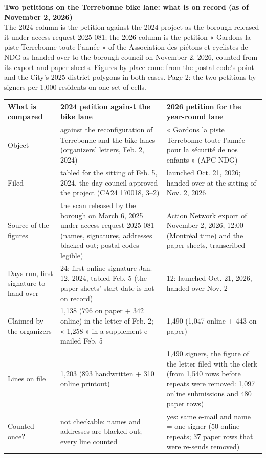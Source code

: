\documentclass[10pt,letterpaper]{article}
\begin{document}
{\large\textbf{Two petitions on the Terrebonne bike lane: what is on record (as of November 2, 2026)}}\\[2pt]
The 2024 column is the petition against the 2024 project as the borough released it under access request 2025-081; the 2026 column is the petition « Gardons la piste Terrebonne toute l\textquoteright année » of the Association des piétons et cyclistes de NDG as handed over to the borough council on November 2, 2026, counted from its export and paper sheets. Figures by place come from the postal code\textquoteright s point and the City\textquoteright s 2025 district polygons in both cases. Page 2: the two petitions by signers per 1,000 residents on one set of cells.\\[6pt]
\footnotesize\begin{tabular}{@{}p{2.05in}p{2.35in}p{2.35in}@{}}\toprule
\textbf{What is compared} & \textbf{2024 petition against the bike lane} & \textbf{2026 petition for the year-round lane} \\ \midrule
Object & against the reconfiguration of Terrebonne and the bike lanes (organizers' letters, Feb. 2, 2024) & « Gardons la piste Terrebonne toute l'année pour la sécurité de nos enfants » (APC-NDG) \\
Filed & tabled for the sitting of Feb. 5, 2024, the day council approved the project (CA24 170018, 3--2) & launched Oct. 21, 2026; handed over at the sitting of Nov. 2, 2026 \\
Source of the figures & the scan released by the borough on March 6, 2025 under access request 2025-081 (names, signatures, addresses blacked out; postal codes legible) & Action Network export of November 2, 2026, 12:00 (Montréal time) and the paper sheets, transcribed \\
\midrule
Days run, first signature to hand-over & 24: first online signature Jan. 12, 2024, tabled Feb. 5 (the paper sheets' start date is not on record) & 12: launched Oct. 21, 2026, handed over Nov. 2 \\
Claimed by the organizers & 1,138 (796 on paper + 342 online) in the letter of Feb. 2; « 1,258 » in a supplement e-mailed Feb. 5 & 1,490 (1,047 online + 443 on paper) \\
Lines on file & 1,203 (893 handwritten + 310 online printout) & 1,490 signers, the figure of the letter filed with the clerk (from 1,540 rows before repeats were removed: 1,097 online submissions and 480 paper rows) \\
Counted once? & not checkable: names and addresses are blacked out; every line counted & yes: same e-mail and name = one signer (50 online repeats; 37 paper rows that were re-sends removed) \\

\end{tabular}
\end{document}
